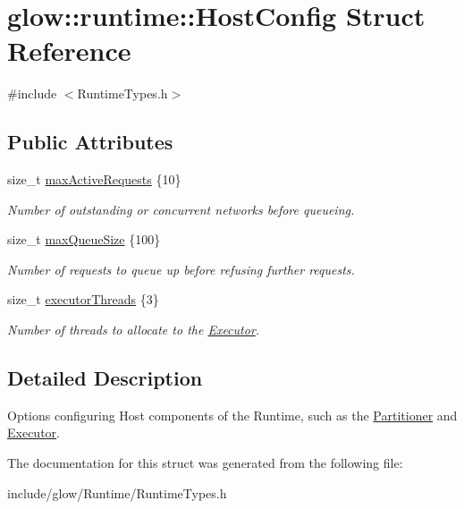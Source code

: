 \hypertarget{structglow_1_1runtime_1_1_host_config}{}\section{glow\+:\+:runtime\+:\+:Host\+Config Struct Reference}
\label{structglow_1_1runtime_1_1_host_config}


{\ttfamily \#include $<$Runtime\+Types.\+h$>$}

\subsection*{Public Attributes}
\begin{DoxyCompactItemize}
\item 
\mbox{\label{structglow_1_1runtime_1_1_host_config_af2768e7f213e865126307f5dafbde26f}} 
size\+\_\+t \hyperlink{structglow_1_1runtime_1_1_host_config_af2768e7f213e865126307f5dafbde26f}{max\+Active\+Requests} \{10\}
\begin{DoxyCompactList}\small\item\em Number of outstanding or concurrent networks before queueing. \end{DoxyCompactList}\item 
\mbox{\label{structglow_1_1runtime_1_1_host_config_ace9f0f8265bb55cc4826e45a8d6e3f1c}} 
size\+\_\+t \hyperlink{structglow_1_1runtime_1_1_host_config_ace9f0f8265bb55cc4826e45a8d6e3f1c}{max\+Queue\+Size} \{100\}
\begin{DoxyCompactList}\small\item\em Number of requests to queue up before refusing further requests. \end{DoxyCompactList}\item 
\mbox{\label{structglow_1_1runtime_1_1_host_config_a3f694d86f0af8281bb87136c539677bb}} 
size\+\_\+t \hyperlink{structglow_1_1runtime_1_1_host_config_a3f694d86f0af8281bb87136c539677bb}{executor\+Threads} \{3\}
\begin{DoxyCompactList}\small\item\em Number of threads to allocate to the \hyperlink{classglow_1_1runtime_1_1_executor}{Executor}. \end{DoxyCompactList}\end{DoxyCompactItemize}


\subsection{Detailed Description}
Options configuring Host components of the Runtime, such as the \hyperlink{classglow_1_1_partitioner}{Partitioner} and \hyperlink{classglow_1_1runtime_1_1_executor}{Executor}. 

The documentation for this struct was generated from the following file\+:\begin{DoxyCompactItemize}
\item 
include/glow/\+Runtime/Runtime\+Types.\+h\end{DoxyCompactItemize}
